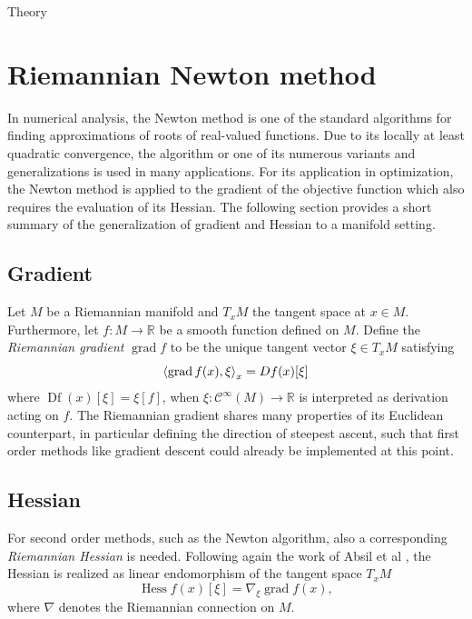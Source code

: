 \begin{chapter}{Theory}
\section{Riemannian Newton method} %
\label{sec:Riemannian Newton method}
In numerical analysis, the Newton method is one of the standard algorithms for finding approximations of roots of real-valued functions. Due to its locally at least quadratic
convergence, the algorithm or one of its numerous variants and generalizations is used in many applications. For its application in optimization, the Newton method is applied to the gradient of the objective function which also requires the evaluation of its Hessian.
The following section provides a short summary of the generalization of gradient and Hessian to a manifold setting.

\subsection{Gradient} %
\label{sub:Gradient}
Let $M$ be a Riemannian manifold and $T_xM$ the tangent space at $x\in M$. Furthermore, let $f: M\to\mathbb{R}$ be a smooth function defined on $M$.
Define the \emph{Riemannian gradient} $\operatorname{grad} f$ to be the unique tangent vector $\xi\in T_xM$ satisfying 
\begin{equation}
    \label{eq:gradient}
    \left\langle \operatorname{grad}f(x),\xi \right\rangle_x=\mathop{Df}(x)[\xi]
\end{equation}
where $\mathop{Df}(x)[\xi] = \xi[f]$, when $\xi:\mathcal{C}^{\infty}(M)\to\mathbb{R}$ is interpreted as derivation acting on $f$. The Riemannian gradient
shares many properties of its Euclidean counterpart, in particular defining the direction of steepest ascent, such that first order methods like
gradient descent could already be implemented at this point.\\

\subsection{Hessian} %
\label{sub:Hessian}
For second order methods, such as the Newton algorithm, also a corresponding \emph{Riemannian Hessian} is needed. Following again the work 
of Absil et al \cite{Absil2009}, the Hessian is realized as linear endomorphism of the tangent space $T_xM$
\begin{equation}
    \label{eq:hessian}
    \operatorname{Hess}f(x)[\xi]=\nabla_{\xi}\operatorname{grad}f(x),
\end{equation}
where $\nabla$ denotes the Riemannian connection on $M$.\\


\end{chapter}

